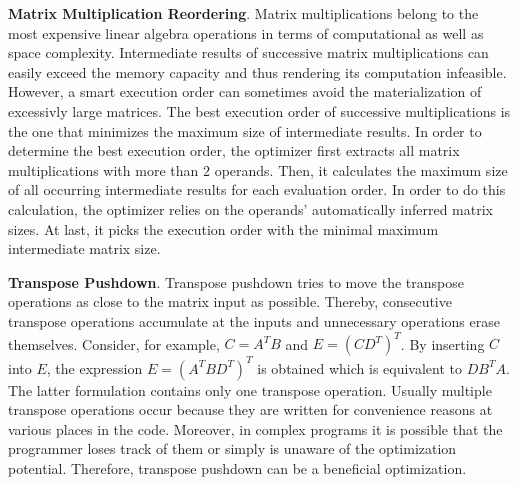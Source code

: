 \textbf{Matrix Multiplication Reordering}. Matrix multiplications belong to the most expensive linear algebra operations in terms of computational as well as space complexity. 
Intermediate results of successive matrix multiplications can easily exceed the memory capacity and thus rendering its computation infeasible. However, a smart execution order can sometimes avoid the materialization of excessivly large matrices. 
The best execution order of successive multiplications is the one that minimizes the maximum size of intermediate results.
In order to determine the best execution order, the optimizer first extracts all matrix multiplications with more than $2$ operands.
Then, it calculates the maximum size of all occurring intermediate results for each evaluation order.
In order to do this calculation, the optimizer relies on the operands' automatically inferred matrix sizes.
At last, it picks the execution order with the minimal maximum intermediate matrix size.

\textbf{Transpose Pushdown}. Transpose pushdown tries to move the transpose operations as close to the matrix input as possible.
Thereby, consecutive transpose operations accumulate at the inputs and unnecessary operations erase themselves.
Consider, for example, $C = A^TB$ and $E = (CD^T)^T$.
By inserting $C$ into $E$, the expression $E=(A^T BD^T)^T$ is obtained which is equivalent to $DB^T A$. 
The latter formulation contains only one transpose operation. 
Usually multiple transpose operations occur because they are written for convenience reasons at various places in the code. 
Moreover, in complex programs it is possible that the programmer loses track of them or simply is unaware of the optimization potential. 
Therefore, transpose pushdown can be a beneficial optimization.